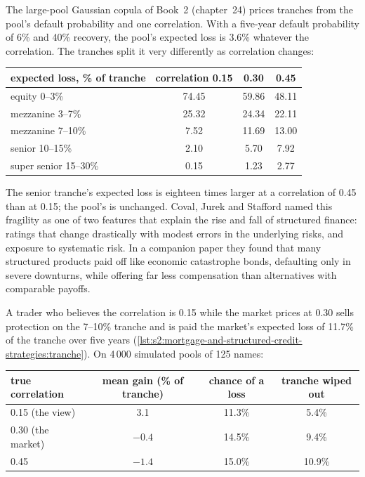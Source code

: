 The large-pool Gaussian copula of Book~2 (chapter~24) prices tranches from the pool's default probability and one correlation. With a five-year
default probability of 6\% and 40\% recovery, the pool's expected loss is 3.6\% whatever the correlation. The tranches split it very differently as
correlation changes:

\begin{center}
\small
\begin{tabular}{@{}lccc@{}}
\toprule
expected loss, \% of tranche & correlation 0.15 & 0.30 & 0.45\\
\midrule
equity 0--3\% & 74.45 & 59.86 & 48.11\\
mezzanine 3--7\% & 25.32 & 24.34 & 22.11\\
mezzanine 7--10\% & 7.52 & 11.69 & 13.00\\
senior 10--15\% & 2.10 & 5.70 & 7.92\\
super senior 15--30\% & 0.15 & 1.23 & 2.77\\
\bottomrule
\end{tabular}
\end{center}

The senior tranche's expected loss is eighteen times larger at a correlation of 0.45 than at 0.15; the pool's is unchanged. Coval, Jurek and Stafford
named this fragility as one of two features that explain the rise and fall of structured finance: ratings that change drastically with modest errors
in the underlying risks, and exposure to systematic risk. In a companion paper they found that many structured products paid off like economic
catastrophe bonds, defaulting only in severe downturns, while offering far less compensation than alternatives with comparable payoffs.

A trader who believes the correlation is 0.15 while the market prices at 0.30 sells protection on the 7--10\% tranche and is paid the market's
expected loss of 11.7\% of the tranche over five years
(\cref{lst:s2:mortgage-and-structured-credit-strategies:tranche}). On 4\,000 simulated pools of 125 names:

\begin{center}
\small
\begin{tabular}{@{}lccc@{}}
\toprule
true correlation & mean gain (\% of tranche) & chance of a loss & tranche wiped out\\
\midrule
0.15 (the view) & 3.1 & 11.3\% & 5.4\%\\
0.30 (the market) & $-0.4$ & 14.5\% & 9.4\%\\
0.45 & $-1.4$ & 15.0\% & 10.9\%\\
\bottomrule
\end{tabular}
\end{center}


